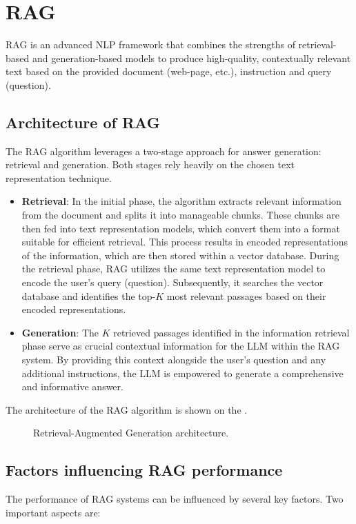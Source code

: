 \section{\acf{RAG}}
\ac{RAG} \cite{lewis2021retrievalaugmented} \nocite{umarjamilai} is an advanced \ac{NLP} framework that combines the strengths of retrieval-based and generation-based models to produce high-quality, contextually relevant text based on the provided document (web-page, etc.), instruction and query (question). 

\subsection{Architecture of \ac{RAG}}
The \ac{RAG} algorithm leverages a two-stage approach for answer generation: retrieval and generation.
Both stages rely heavily on the chosen text representation technique.

\begin{itemize}
  \item \textbf{Retrieval}:
 In the initial phase, the algorithm extracts relevant information from the document and splits it into manageable chunks.
 These chunks are then fed into text representation models, which convert them into a format suitable for efficient retrieval.
 This process results in encoded representations of the information, which are then stored within a vector database.
 During the retrieval phase, \ac{RAG} utilizes the same text representation model to encode the user's query (question).
 Subsequently, it searches the vector database and identifies the top-$K$ most relevant passages based on their encoded representations.
  \item \textbf{Generation}:
 The $K$ retrieved passages identified in the information retrieval phase serve as crucial contextual information for the \ac{LLM} within the \ac{RAG} system.
 By providing this context alongside the user's question and any additional instructions, the \ac{LLM} is empowered to generate a comprehensive and informative answer.
\end{itemize}

The architecture of the \ac{RAG} algorithm is shown on the .

\begin{figure}[h]
 \centering
  
 \caption{Retrieval-Augmented Generation architecture.}
  \label{fig:RAG_scheme}
\end{figure}

\subsection{Factors influencing \ac{RAG} performance}
The performance of \ac{RAG} systems can be influenced by several key factors.
Two important aspects are:

